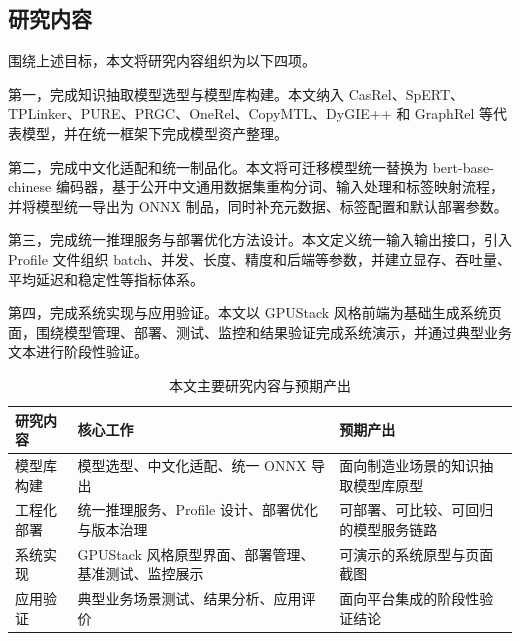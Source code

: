 \subsection{研究内容}
围绕上述目标，本文将研究内容组织为以下四项。

第一，完成知识抽取模型选型与模型库构建。本文纳入 CasRel、SpERT、TPLinker、PURE、PRGC、OneRel、CopyMTL、DyGIE++ 和 GraphRel 等代表模型，并在统一框架下完成模型资产整理。

第二，完成中文化适配和统一制品化。本文将可迁移模型统一替换为 bert-base-chinese 编码器，基于公开中文通用数据集重构分词、输入处理和标签映射流程，并将模型统一导出为 ONNX 制品，同时补充元数据、标签配置和默认部署参数。

第三，完成统一推理服务与部署优化方法设计。本文定义统一输入输出接口，引入 Profile 文件组织 batch、并发、长度、精度和后端等参数，并建立显存、吞吐量、平均延迟和稳定性等指标体系。

第四，完成系统实现与应用验证。本文以 GPUStack 风格前端为基础生成系统页面，围绕模型管理、部署、测试、监控和结果验证完成系统演示，并通过典型业务文本进行阶段性验证。

\begin{table}[htbp]
  \centering
  \caption{本文主要研究内容与预期产出}
  \vspace{0.5em}\wuhao
  \begin{tabularx}{\textwidth}{l X X}
    \toprule
    研究内容 & 核心工作 & 预期产出 \\
    \midrule
    模型库构建 & 模型选型、中文化适配、统一 ONNX 导出 & 面向制造业场景的知识抽取模型库原型 \\
    工程化部署 & 统一推理服务、Profile 设计、部署优化与版本治理 & 可部署、可比较、可回归的模型服务链路 \\
    系统实现 & GPUStack 风格原型界面、部署管理、基准测试、监控展示 & 可演示的系统原型与页面截图 \\
    应用验证 & 典型业务场景测试、结果分析、应用评价 & 面向平台集成的阶段性验证结论 \\
    \bottomrule
  \end{tabularx}
  \label{tab:intro_work_expand}
\end{table}

